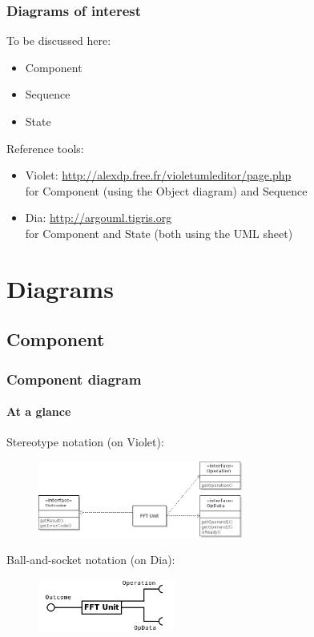 \begin{frame}
\frametitle{Diagrams of interest}

\begin{block}{To be discussed here:}
\begin{itemize}
\item Component
\item Sequence
\item State
\end{itemize}
\end{block}

\begin{block}{Reference tools:}
\begin{itemize}
\item Violet: \url{http://alexdp.free.fr/violetumleditor/page.php}
\\ for Component (using the Object diagram) and Sequence
\item Dia: \url{http://argouml.tigris.org}
\\ for Component and State (both using the UML sheet)
\end{itemize}
\end{block}

\end{frame}

\section{Diagrams}

\subsection{Component}

\begin{frame}
\frametitle{Component diagram}
\framesubtitle{At a glance}

Stereotype notation (on Violet):
\begin{figure}

\includegraphics[width=0.6\textwidth]{lecture02/img/stereotype_components.png}

\end{figure}
Ball-and-socket notation (on Dia):
\begin{figure}

\includegraphics[width=0.4\textwidth]{lecture02/img/ballsocket_components.png}

\end{figure}


\end{frame}

